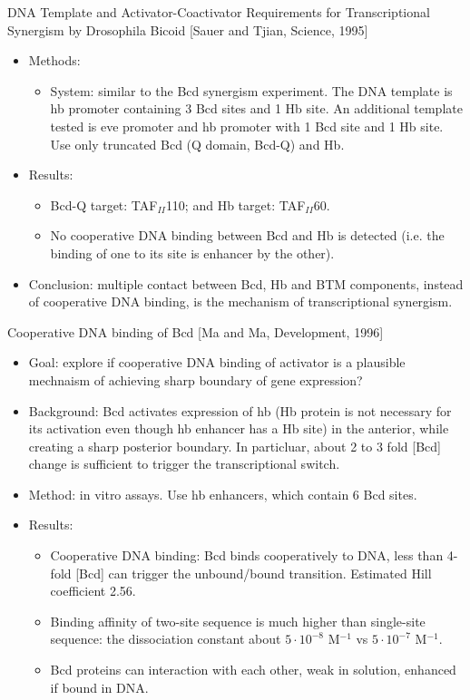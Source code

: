 \documentclass{report}
\begin{document}
DNA Template and Activator-Coactivator Requirements for Transcriptional Synergism by Drosophila Bicoid [Sauer and Tjian, Science, 1995]
\begin{itemize}
	\item Methods: 
	\begin{itemize}
		\item System: similar to the Bcd synergism experiment. The DNA template is hb promoter containing 3 Bcd sites and 1 Hb site. An additional template tested is eve promoter and hb promoter with 1 Bcd site and 1 Hb site. Use only truncated Bcd (Q domain, Bcd-Q) and Hb.  
	\end{itemize}
	
	\item Results: 
	\begin{itemize}
		\item Bcd-Q target: TAF$_{II}$110; and Hb target: TAF$_{II}$60. 
		\item No cooperative DNA binding between Bcd and Hb is detected (i.e. the binding of one to its site is enhancer by the other). 
	\end{itemize}
	
	\item Conclusion: multiple contact between Bcd, Hb and BTM components, instead of cooperative DNA binding, is the mechanism of transcriptional synergism. 
\end{itemize}

Cooperative DNA binding of Bcd [Ma and Ma, Development, 1996]
\begin{itemize}
	\item Goal: explore if cooperative DNA binding of activator is a plausible mechnaism of achieving sharp boundary of gene expression? 
	
	\item Background: Bcd activates expression of hb (Hb protein is not necessary for its activation even though hb enhancer has a Hb site) in the anterior, while creating a sharp posterior boundary. In particluar, about 2 to 3 fold [Bcd] change is sufficient to trigger the transcriptional switch. 
	
	\item Method: in vitro assays. Use hb enhancers, which contain 6 Bcd sites. 
	
	\item Results: 
	\begin{itemize}
		\item Cooperative DNA binding: Bcd binds cooperatively to DNA, less than 4-fold [Bcd] can trigger the unbound/bound transition. Estimated Hill coefficient 2.56. 
		\item Binding affinity of two-site sequence is much higher than single-site sequence: the dissociation constant about $5 \cdot 10^{-8}$ M$^{-1}$ vs $5 \cdot 10^{-7}$ M$^{-1}$. 
		\item Bcd proteins can interaction with each other, weak in solution, enhanced if bound in DNA. 
	\end{itemize}
\end{itemize}
\end{document}
